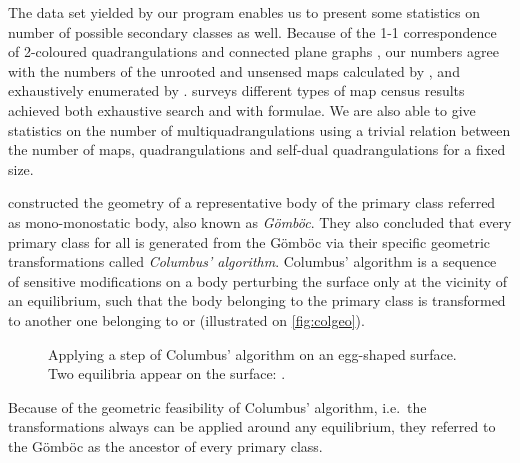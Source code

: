 \documentclass[]{article}
\newcommand{\Gomboc}{Gömböc\xspace}
\begin{document}
The data set yielded by our program enables us to present some statistics on number of possible secondary classes as well.
Because of the 1-1 correspondence of 2-coloured quadrangulations and connected plane graphs \cite{Fusy2007,Brinkmann2005}, our numbers agree with the numbers of the unrooted and unsensed maps calculated by \citet{Wormald1981}, and exhaustively enumerated by \citet{Walsh1983, Walsh2012}.
\citet{Walsh2007} surveys different types of map census results achieved both exhaustive search and with formulae.
We are also able to give statistics on the number of multiquadrangulations using a trivial relation between the number of maps, quadrangulations  and self-dual quadrangulations for a fixed size.


\citet{Domokos2006} constructed the geometry of a representative body of the primary class  referred as mono-monostatic body, also known as \emph{Gömböc}.
They also concluded that every primary class for all  is generated from the \Gomboc via their specific geometric transformations called \emph{Columbus' algorithm}. Columbus' algorithm is a sequence of sensitive modifications on a body perturbing the surface only at the vicinity of an equilibrium, such that the body belonging to the primary class  is transformed to another one belonging to  or  (illustrated on \autoref{fig:colgeo}).
\begin{figure}\centering
  \qquad
\caption{Applying a step of Columbus' algorithm on an egg-shaped surface.
Two equilibria appear on the surface: .}
  \label{fig:colgeo}
\end{figure}
Because of the geometric feasibility of Columbus' algorithm, i.e.~the transformations always can be applied around any equilibrium, they referred to the \Gomboc as the ancestor of every primary class.
\end{document}
